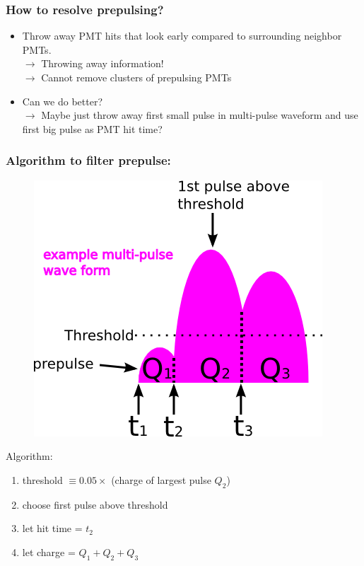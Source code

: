 \documentclass{beamer}
\begin{document}
\begin{frame}
	\frametitle{How to resolve prepulsing?}
	\begin{itemize}
		\item Throw away PMT hits that look early compared to surrounding
			neighbor PMTs. \\
			$\rightarrow$ Throwing away information! \\
			$\rightarrow$ Cannot remove clusters of prepulsing PMTs
		\item Can we do better? \\
			$\rightarrow$ Maybe just throw away first small pulse in multi-pulse
			waveform and use first big pulse as PMT hit time?
	\end{itemize}
\end{frame}

\begin{frame}
	\frametitle{Algorithm to filter prepulse:}
	\begin{figure}
		\centering
		\includegraphics[height=0.45\textheight]{prepulse}
	\end{figure}
	Algorithm:
	\begin{enumerate}
		\item threshold $\equiv 0.05 \times$ (charge of largest pulse $Q_2$)
		\item choose first pulse above threshold
		\item let hit time = $t_2$
		\item let charge = $Q_1 + Q_2 + Q_3$
	\end{enumerate}
\end{frame}
\end{document}
